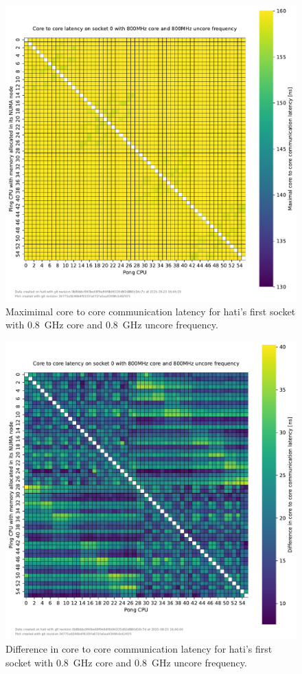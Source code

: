 \begin{figure}[]
    \centering
    \includegraphics[width=\columnwidth]{fig/core-to-core-latency/core-to-core-heatmap-max-800-800.pdf}
    \caption{Maximimal core to core communication latency for hati's first socket with \SI{0.8}{\GHz} core and \SI{0.8}{\GHz} uncore frequency.}
\end{figure}
\begin{figure}[]
    \centering
    \includegraphics[width=\columnwidth]{fig/core-to-core-latency/core-to-core-heatmap-diff-800-800.pdf}
    \caption{Difference in core to core communication latency for hati's first socket with \SI{0.8}{\GHz} core and \SI{0.8}{\GHz} uncore frequency.}
\end{figure}

